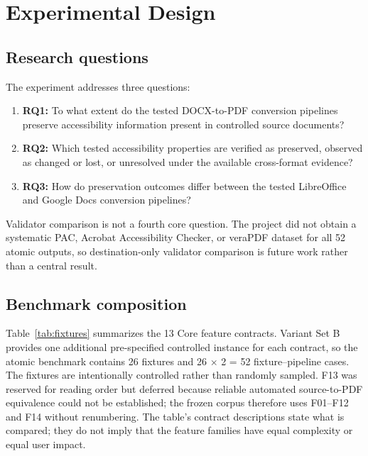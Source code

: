 \section{Experimental Design}
\label{sec:experiment}

\subsection{Research questions}

The experiment addresses three questions:

\begin{enumerate}
\item \textbf{RQ1:} To what extent do the tested DOCX-to-PDF conversion pipelines preserve accessibility information present in controlled source documents?
\item \textbf{RQ2:} Which tested accessibility properties are verified as preserved, observed as changed or lost, or unresolved under the available cross-format evidence?
\item \textbf{RQ3:} How do preservation outcomes differ between the tested LibreOffice and Google Docs conversion pipelines?
\end{enumerate}

Validator comparison is not a fourth core question. The project did not obtain a systematic PAC, Acrobat Accessibility Checker, or veraPDF dataset for all 52 atomic outputs, so destination-only validator comparison is future work rather than a central result.

\subsection{Benchmark composition}

Table~\ref{tab:fixtures} summarizes the 13 Core feature contracts. Variant Set B provides one additional pre-specified controlled instance for each contract, so the atomic benchmark contains 26 fixtures and 26 $\times$ 2 = 52 fixture--pipeline cases. The fixtures are intentionally controlled rather than randomly sampled. F13 was reserved for reading order but deferred because reliable automated source-to-PDF equivalence could not be established; the frozen corpus therefore uses F01--F12 and F14 without renumbering. The table's contract descriptions state what is compared; they do not imply that the feature families have equal complexity or equal user impact.

